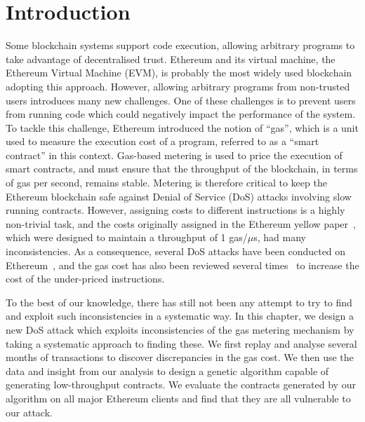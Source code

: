 \section{Introduction}
\label{sec:introduction}

Some blockchain systems support code execution, allowing arbitrary programs to take advantage of decentralised trust. Ethereum and its virtual machine, the Ethereum Virtual Machine (EVM), is probably the most widely  used blockchain adopting this approach. However, allowing arbitrary programs from non-trusted users introduces many new challenges. One of these challenges is to prevent users from running code which could negatively impact the performance of the system. To tackle this challenge, Ethereum introduced the notion of ``gas'', which is a unit used to measure the execution cost of a program, referred to as a ``smart contract'' in this context. Gas-based metering is used to price the execution of smart contracts, and must ensure that the throughput of the blockchain, in terms of gas per second, remains stable. Metering is therefore critical to keep the Ethereum blockchain safe against Denial of Service (DoS) attacks involving slow running contracts. However, assigning costs to different instructions is a highly non-trivial task, and the costs originally assigned in the Ethereum yellow paper~\cite{wood2014ethereum}, which were designed to maintain a throughput of 1 gas/$\mu$s, had many inconsistencies. As a consequence, several DoS attacks have been conducted on Ethereum~\cite{transaction-spam-attack,suicide-attack}, and the gas cost has also been reviewed several times~\cite{erc150,eip-1884} to increase the cost of the under-priced instructions.

To the best of our knowledge, there has still not been any attempt to try to find and exploit such inconsistencies in a systematic way. In this chapter, we design a new DoS attack which exploits inconsistencies of the gas metering mechanism by taking a systematic approach to finding these. We first replay and analyse several months of transactions to discover discrepancies in the gas cost. We then use the data and insight from our analysis to design a genetic algorithm capable of generating low-throughput contracts. We evaluate the contracts generated by our algorithm on all major Ethereum clients and find that they are all vulnerable to our attack.

